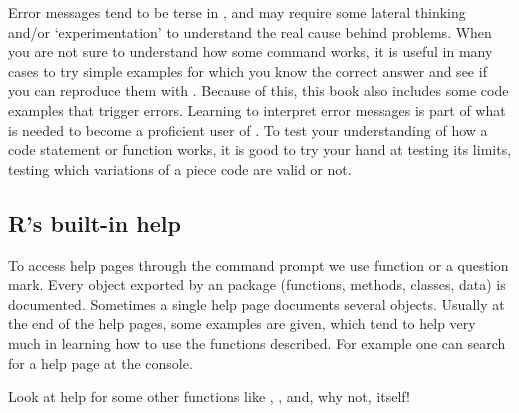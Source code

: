 \documentclass[krantz2]{krantz}\usepackage{knitr}%
\begin{document}
\begin{warningbox}
Error messages tend to be terse in \Rpgrm, and may require some lateral thinking and/or `experimentation' to understand the real cause behind problems. When you are not sure to understand how some command works, it is useful in many cases to try simple examples for which you know the correct answer and see if you can reproduce them with \Rpgrm. Because of this, this book also includes some code examples that trigger errors. Learning to interpret error messages is part of what is needed to become a proficient user of \Rlang. To test your understanding of how a code statement or function works, it is good to try your hand at testing its limits, testing which variations of a piece code are valid or not.
\end{warningbox}

\subsection{R's built-in help}

To access help pages through the command prompt we use function  or a question mark. Every object exported by an \Rlang package (functions, methods, classes, data) is documented. Sometimes a single help page documents several \Rlang objects. Usually at the end of the help pages, some examples are given, which tend to help very much in learning how to use the functions described. For example one can search for a help page at the \Rpgrm console.

\begin{knitrout}\footnotesize
{}\color{fgcolor}\begin{kframe}
\begin{alltt}
\hlstd{(}\hlstd{)}
\end{alltt}
\end{kframe}
\end{knitrout}

\begin{playground}
Look at help for some other functions like , ,  and, why not,  itself!
\begin{knitrout}\footnotesize
{}\color{fgcolor}\begin{kframe}
\begin{alltt}
\end{alltt}
\end{kframe}
\end{knitrout}
\end{playground}
\end{document}
